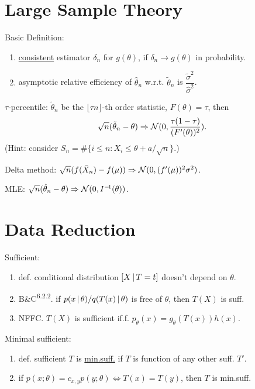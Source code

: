 

\section*{Large Sample Theory}

Basic Definition:
\begin{enumerate}[
        leftmargin = 2em,
    ]
    \item \underline{consistent} estimator $\delta_n$ for $g(\theta)$, if $\delta_n \rightarrow g(\theta)$ in probability.
    \item \vspace{-1ex} asymptotic relative efficiency of $\hat{\theta}_n$ w.r.t. $\tilde{\theta}_n$ is  $\dfrac{ \tilde{\sigma}^2 }{ \hat{\sigma}^2 }$.
\end{enumerate}

\vspace{-1ex} $\tau$-percentile: $\tilde{\theta}_n$ be the $\lfloor \tau n \rfloor$-th order statistic, $F(\theta) = \tau$, then $$
    \sqrt{n}(\tilde{\theta}_n - \theta) \Rightarrow \mathcal{N}(0, \frac{\tau (1-\tau)}{(F'(\theta))^2}).
$$
(Hint: consider $S_n = \#\{i \leq n: X_i \leq \theta + {a}/{\sqrt{n}}\}$.)

Delta method: $\sqrt{n}(f(\bar{X}_n) - f(\mu)) \Rightarrow \mathcal{N}(0, (f'(\mu))^2 \sigma^2)$.

MLE: $\sqrt{n} (\hat{\theta}_n - \theta) \Rightarrow \mathcal{N}(0, I^{-\!1}(\theta))$.




\section*{Data Reduction}

Sufficient: \begin{enumerate}[
        leftmargin = 2em,
    ]
    \item def. conditional distribution $[X \, | \, T=t]$ doesn't depend on $\theta$.
    \item B\&C\textsuperscript{6.2.2}. if $p(x \, | \, \theta) / q(T(x) \, | \, \theta)$ is free of $\theta$, then $T(X)$ is suff.
    \item NFFC. $T(X)$ is sufficient if.f. $p_\theta(x) = g_\theta(T(x)) h(x)$.
\end{enumerate}

Minimal sufficient: %
    \begin{enumerate}[
        leftmargin = 2em,
    ]
    \item def. sufficient $T$ is \underline{min.suff.} if $T$ is function of any other suff. $T'$.
    \item if $p(x; \theta) = c_{x, y} p(y; \theta) \Leftrightarrow T(x) = T(y)$, then $T$ is min.suff.
\end{enumerate}

